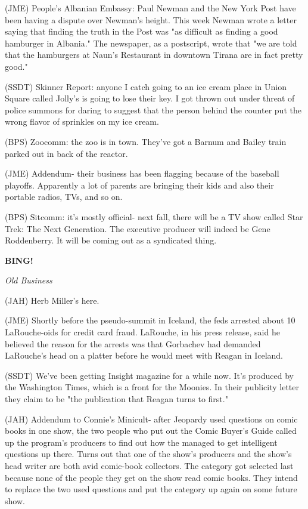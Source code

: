 \documentclass[12pt]{article}
\newcommand{\bing}{{\bf BING!} }
\newcommand{\goto}[1]{\bing \vskip 12pt \centerline{{\em{#1}}}}
\begin{document}
(JME) People's Albanian Embassy: Paul Newman and the New York Post have been having a dispute over Newman's height. This week Newman wrote a letter saying that finding the truth in the Post was "as difficult as finding a good hamburger in Albania." The newspaper, as a postscript, wrote that "we are told that the hamburgers at Naun's Restaurant in downtown Tirana are in fact pretty good."

(SSDT) Skinner Report: anyone I catch going to an ice cream place in Union Square called Jolly's is going to lose their key. I got thrown out under threat of police summons for daring to suggest that the person behind the counter put the wrong flavor of sprinkles on my ice cream.

(BPS) Zoocomm: the zoo is in town. They've got a Barnum and Bailey train parked out in back of the reactor.

(JME) Addendum- their business has been flagging because of the baseball playoffs. Apparently a lot of parents are bringing their kids and also their portable radios, TVs, and so on.

(BPS) Sitcomm: it's mostly official- next fall, there will be a TV show called Star Trek: The Next Generation. The executive producer will indeed be Gene Roddenberry. It will be coming out as a syndicated thing.

\goto{Old Business}

(JAH) Herb Miller's here.

(JME) Shortly before the pseudo-summit in Iceland, the feds arrested about 10 LaRouche-oids for credit card fraud. LaRouche, in his press release, said he believed the reason for the arrests was that Gorbachev had demanded LaRouche's head on a platter before he would meet with Reagan in Iceland.

(SSDT) We've been getting Insight magazine for a while now. It's produced by the Washington Times, which is a front for the Moonies. In their publicity letter they claim to be "the publication that Reagan turns to first."

(JAH) Addendum to Connie's Minicult- after Jeopardy used questions on comic books in one show, the two people who put out the Comic Buyer's Guide called up the program's producers to find out how the managed to get intelligent questions up there. Turns out that one of the show's producers and the show's head writer are both avid comic-book collectors. The category got selected last because none of the people they get on the show read comic books. They intend to replace the two used questions and put the category up again on some future show.
\end{document}
